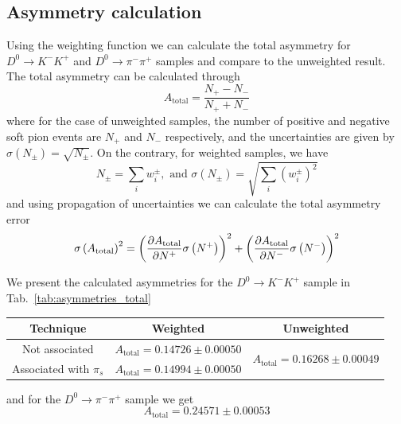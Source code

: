 \documentclass{article}
\begin{document}
        \pagebreak

        \subsection{Asymmetry calculation}
        Using the weighting function we can calculate the total asymmetry for $D^0\to K^-K^+$ and $D^0\to\pi^-\pi^+$ samples and compare to the unweighted result.
        The total asymmetry can be calculated through
        \begin{equation}
                A_\text{total} = \frac{N_+ - N_-}{N_+ + N_-}
        \end{equation}
        where for the case of unweighted samples, the number of positive and negative soft pion events are $N_+$ and $N_-$ respectively, and the uncertainties are given by $\sigma\left(N_\pm\right) = \sqrt{N_{\pm}}$.
        On the contrary, for weighted samples, we have
        \begin{equation}
                N_\pm = \sum_i w_i^\pm, \text{ and } \sigma\left(N_\pm\right) = \sqrt{\sum_i (w_i^\pm)^2}
        \end{equation} 
        and using propagation of uncertainties we can calculate the total asymmetry error
        \begin{equation}
                \sigma\left(A_{\text{total}}\right)^2 = \left(\pdv{A_{\text{total}}}{N^+}\sigma\left(N^+\right)\right)^2 + \left(\pdv{A_{\text{total}}}{N^-}\sigma\left(N^-\right)\right)^2
        \end{equation}

        We present the calculated asymmetries for the $D^0\to K^-K^+$ sample in Tab.~\ref{tab:asymmetries_total}
        \begin{center}
                \begin{tabular}{c|c|c}
                        Technique & Weighted & Unweighted\\
                        \hline\hline
                        Not associated & $A_\text{total} = 0.14726 \pm 0.00050$ & \multirow{2}{*}{$A_\text{total} = 0.16268 \pm 0.00049$}\\
                        \cline{1-2}
                        Associated with $\pi_s$ & $A_\text{total} = 0.14994 \pm 0.00050$ & \\
                \end{tabular}
                \label{tab:asymmetries_total}
        \end{center}
        and for the $D^0\to \pi^-\pi^+$ sample we get
        \begin{equation}
                A_\text{total} = 0.24571 \pm 0.00053
        \end{equation} 
\end{document}
